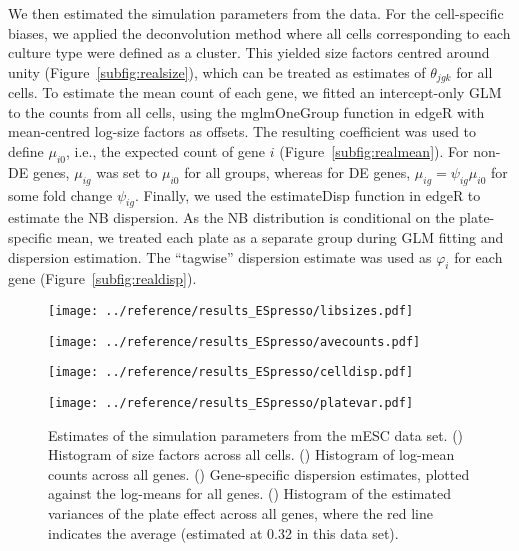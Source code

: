 \documentclass{article}
\begin{document}
We then estimated the simulation parameters from the data.
For the cell-specific biases, we applied the deconvolution method \citep{lun2016pooling} where all cells corresponding to each culture type were defined as a cluster.
This yielded size factors centred around unity (Figure~\ref{subfig:realsize}), which can be treated as estimates of $\theta_{jgk}$ for all cells.
To estimate the mean count of each gene, we fitted an intercept-only GLM to the counts from all cells, using the mglmOneGroup function in edgeR with mean-centred log-size factors as offsets.
The resulting coefficient was used to define $\mu_{i0}$, i.e., the expected count of gene $i$ (Figure~\ref{subfig:realmean}).
For non-DE genes, $\mu_{ig}$ was set to $\mu_{i0}$ for all groups, whereas for DE genes, $\mu_{ig} = \psi_{ig}\mu_{i0}$ for some fold change $\psi_{ig}$.
Finally, we used the estimateDisp function in edgeR to estimate the NB dispersion.
As the NB distribution is conditional on the plate-specific mean, we treated each plate as a separate group during GLM fitting and dispersion estimation.
The ``tagwise'' dispersion estimate was used as $\varphi_i$ for each gene (Figure~\ref{subfig:realdisp}).

\begin{figure}[p]
    \begin{minipage}{0.49\textwidth}
        \texttt{[image: ../reference/results\_ESpresso/libsizes.pdf]}
        \subcaption[]{}
        \label{subfig:realsize}
    \end{minipage}
    \begin{minipage}{0.49\textwidth}
        \texttt{[image: ../reference/results\_ESpresso/avecounts.pdf]}
        \subcaption[]{}
        \label{subfig:realmean}
    \end{minipage}
    \begin{minipage}{0.49\textwidth}
        \texttt{[image: ../reference/results\_ESpresso/celldisp.pdf]}
        \subcaption[]{}
        \label{subfig:realdisp}
    \end{minipage}
    \begin{minipage}{0.49\textwidth}
        \texttt{[image: ../reference/results\_ESpresso/platevar.pdf]}
        \subcaption[]{}
        \label{subfig:realplate}
    \end{minipage}
    \caption{Estimates of the simulation parameters from the mESC data set.
        () Histogram of size factors across all cells.
        () Histogram of log-mean counts across all genes.
        () Gene-specific dispersion estimates, plotted against the log-means for all genes.
        () Histogram of the estimated variances of the plate effect across all genes, where the red line indicates the average (estimated at 0.32 in this data set).
    }
\end{figure}
\end{document}
